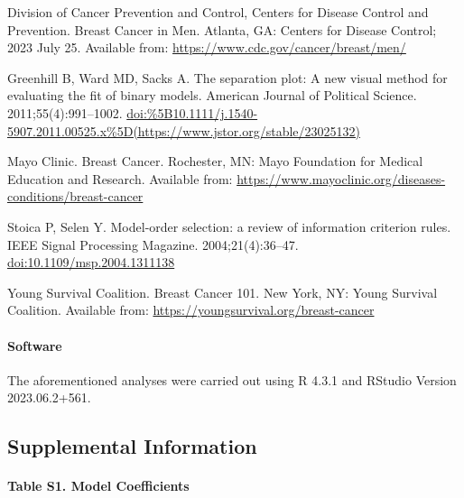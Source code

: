 \documentclass[]{article}
\let\oldparagraph\paragraph
\renewcommand{\paragraph}[1]{\oldparagraph{#1}\mbox{}}
\begin{document}
Division of Cancer Prevention and Control, Centers for Disease Control
and Prevention. Breast Cancer in Men. Atlanta, GA: Centers for Disease
Control; 2023 July 25. Available from:
\href{https://www.cdc.gov/cancer/breast/men/index.htm\#:~:text=Breast\%20cancer\%20is\%20most\%20often,is\%20found\%20in\%20a\%20man.\&text=Invasive\%20ductal\%20carcinoma.,parts\%20of\%20the\%20breast\%20tissue.}{https://www.cdc.gov/cancer/breast/men/}

Greenhill B, Ward MD, Sacks A. The separation plot: A new visual method
for evaluating the fit of binary models. American Journal of Political
Science. 2011;55(4):991--1002.
\url{doi:\%5B10.1111/j.1540-5907.2011.00525.x\%5D(https://www.jstor.org/stable/23025132)}

Mayo Clinic. Breast Cancer. Rochester, MN: Mayo Foundation for Medical
Education and Research. Available from:
\href{https://www.mayoclinic.org/diseases-conditions/breast-cancer/symptoms-causes/syc-20352470}{https://www.mayoclinic.org/diseases-conditions/breast-cancer}

Stoica P, Selen Y. Model-order selection: a review of information
criterion rules. IEEE Signal Processing Magazine. 2004;21(4):36--47.
\href{https://ieeexplore.ieee.org/document/1311138}{doi:10.1109/msp.2004.1311138}

Young Survival Coalition. Breast Cancer 101. New York, NY: Young
Survival Coalition. Available from:
\href{https://youngsurvival.org/breast-cancer-101?gad_source=1\&gclid=CjwKCAiAg9urBhB_EiwAgw88mcI-WsyaKEn-nTaWET71dtNVebk2y3qHMeLMjBnxk42z-sE5LMbPPRoCLZYQAvD_BwE}{https://youngsurvival.org/breast-cancer}

\hypertarget{software}{%
\paragraph{Software}\label{software}}

The aforementioned analyses were carried out using R 4.3.1 and RStudio
Version 2023.06.2+561.

\newpage

\hypertarget{supplemental-information}{%
\subsection{Supplemental Information}\label{supplemental-information}}

\hypertarget{table-s1.-model-coefficients}{%
\paragraph{Table S1. Model
Coefficients}\label{table-s1.-model-coefficients}}
\end{document}
